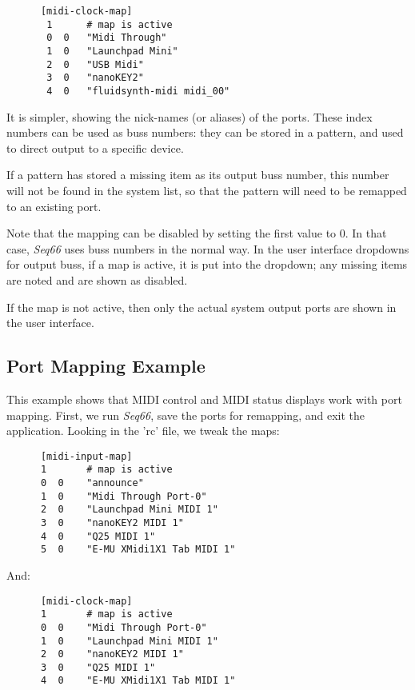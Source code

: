    \begin{verbatim}
      [midi-clock-map]
       1      # map is active
       0  0   "Midi Through"
       1  0   "Launchpad Mini"
       2  0   "USB Midi"
       3  0   "nanoKEY2"
       4  0   "fluidsynth-midi midi_00"
   \end{verbatim}
   
   It is simpler, showing the nick-names (or aliases) of the ports.
   These index numbers can be used as buss numbers: they can be stored
   in a pattern, and used to direct output to a specific device.

   If a pattern has stored a missing item as its output
   buss number, this number will not be found in the system list, so that the
   pattern will need to be remapped to an existing port.

   Note that the mapping can be disabled by setting the first value to 0.  In
   that case, \textsl{Seq66} uses buss numbers in the normal way.
   In the user interface dropdowns for output buss, if a map is active, it is
   put into the dropdown; any missing items are noted and are shown as
   disabled.

   If the map is not active, then only the actual system output ports are
   shown in the user interface.

\subsection{Port Mapping Example}
\label{subsec:input_port_mapping_example}

   This example shows that MIDI control and MIDI status displays work with
   port mapping.  First, we run \textsl{Seq66}, save the ports for
   remapping, and exit the application.  Looking in the 'rc' file, we tweak
   the maps:

   \begin{verbatim}
      [midi-input-map]
      1       # map is active
      0  0    "announce"
      1  0    "Midi Through Port-0"
      2  0    "Launchpad Mini MIDI 1"
      3  0    "nanoKEY2 MIDI 1"
      4  0    "Q25 MIDI 1"
      5  0    "E-MU XMidi1X1 Tab MIDI 1"
   \end{verbatim}

   And:

   \begin{verbatim}
      [midi-clock-map]
      1       # map is active
      0  0    "Midi Through Port-0"
      1  0    "Launchpad Mini MIDI 1"
      2  0    "nanoKEY2 MIDI 1"
      3  0    "Q25 MIDI 1"
      4  0    "E-MU XMidi1X1 Tab MIDI 1"
   \end{verbatim}

